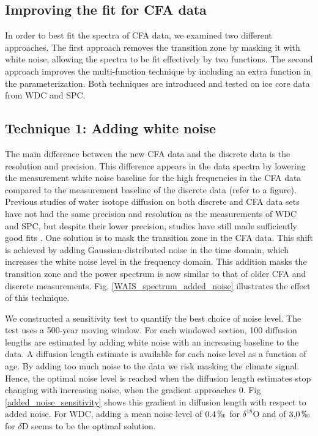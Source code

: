 \documentclass[draft, jgrga]{AGUTeX}
\begin{document}
\begin{article}
\section{Improving the fit for CFA data}
In order to best fit the spectra of CFA data, we examined two different approaches. The first approach removes the transition zone by masking it with white noise, allowing the spectra to be fit effectively by two functions. The second approach improves the multi-function technique by including an extra function in the parameterization. Both techniques are introduced and tested on ice core data from WDC and SPC.

\subsection{Technique 1: Adding white noise}
The main difference between the new CFA data and the discrete data is the resolution and precision. This difference appears in the data spectra by lowering the measurement white noise baseline for the high frequencies in the CFA data compared to the measurement baseline of the discrete data (refer to a figure). Previous studies of water isotope diffusion on both discrete and CFA data sets have not had the same precision and resolution as the measurements of WDC and SPC, but despite their lower precision, studies have still made sufficiently good fits \citep{Gkinis2014,Holme2017}. One solution is to mask the transition zone in the CFA data. This shift is achieved by adding Gaussian-distributed noise in the time domain, which increases the white noise level in the frequency domain. This addition masks the transition zone and the power spectrum is now similar to that of older CFA and discrete measurements. Fig. \ref{WAIS_spectrum_added_noise} illustrates the effect of this technique.

We constructed a sensitivity test to quantify the best choice of noise level. The test uses a 500-year moving window. For each windowed section, 100 diffusion lengths are estimated by adding white noise with an increasing baseline to the data. A diffusion length estimate is available for each noise level as a function of age. By adding too much noise to the data we risk masking the climate signal. Hence, the optimal noise level is reached when the diffusion length estimates stop changing with increasing noise, when the gradient approaches 0. Fig \ref{added_noise_sensitivity} shows this gradient in diffusion length with respect to added noise. For WDC, adding a mean noise level of $0.4 \, \permil$ for $\delta^{18}$O  and of $3.0 \,\permil$ for $\delta$D seems to be the optimal solution.


\end{article}
\end{document}
